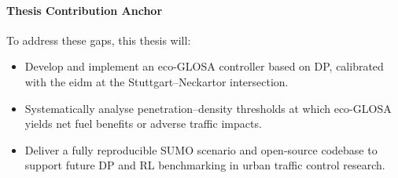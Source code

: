 \paragraph{Thesis Contribution Anchor}  
To address these gaps, this thesis will:
\begin{itemize}
  \item Develop and implement an eco-GLOSA controller based on DP, calibrated with the \ac{eidm} at the Stuttgart–Neckartor intersection.
  \item Systematically analyse penetration–density thresholds at which eco-GLOSA yields net fuel benefits or adverse traffic impacts.
  \item Deliver a fully reproducible SUMO scenario and open-source codebase to support future DP and RL benchmarking in urban traffic control research.
\end{itemize}
